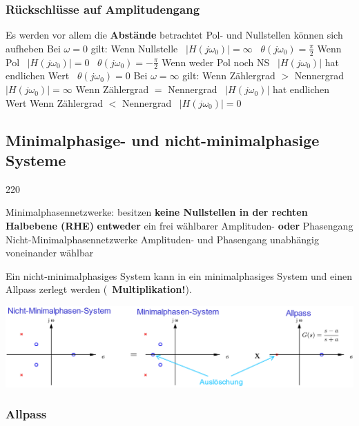 \subsubsection{Rückschlüsse auf Amplitudengang}

\begin{outline}
    \1 Es werden vor allem die \textbf{Abstände} betrachtet 
    \1 Pol- und Nullstellen können sich aufheben
    \1 Bei $\omega = 0$ gilt:
        \2 Wenn Nullstelle \textrightarrow\ $|H(j \omega_0)| = \infty$ \textrightarrow\ $\theta(j \omega_0) = \frac{\pi}{2}$
        \2 Wenn Pol \textrightarrow\ $|H(j \omega_0)| = 0$ \textrightarrow\ $\theta(j \omega_0) = -\frac{\pi}{2}$
        \2 Wenn weder Pol noch NS \textrightarrow\ $|H(j \omega_0)|$ hat endlichen Wert \textrightarrow\ $\theta(j \omega_0) = 0$
    \1 Bei $\omega = \infty$ gilt:
        \2 Wenn Zählergrad $>$ Nennergrad \textrightarrow\ $|H(j \omega_0)| = \infty$
        \2 Wenn Zählergrad $=$ Nennergrad \textrightarrow\ $|H(j \omega_0)|$ hat endlichen Wert
        \2 Wenn Zählergrad $<$ Nennergrad \textrightarrow\ $|H(j \omega_0)| = 0$
\end{outline}


\subsection{Minimalphasige- und nicht-minimalphasige Systeme}{220}

\begin{outline}
    \1 Minimalphasennetzwerke: 
        \2 besitzen \textbf{keine Nullstellen in der rechten Halbebene (RHE)}
        \2 \textbf{entweder} ein frei wählbarer Amplituden- \textbf{oder} Phasengang
    \1 Nicht-Minimalphasennetzwerke
        \2 Amplituden- und Phasengang unabhängig voneinander wählbar
\end{outline}



Ein nicht-minimalphasiges System kann in ein minimalphasiges System und einen Allpass zerlegt werden
(\textrightarrow\ \textbf{Multiplikation!}). 

\includegraphics[width=\columnwidth]{images/beispiel_minimalphasensystem.png}


\subsubsection{Allpass}
